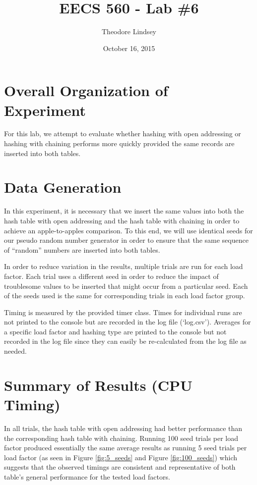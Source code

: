 \documentclass{article}
\title{EECS 560 - Lab \#6}
\author{Theodore Lindsey}
\date{October 16, 2015}
\begin{document}
\maketitle


\section{Overall Organization of Experiment}

For this lab, we attempt to evaluate whether hashing with open addressing or hashing with chaining performs more quickly provided the same records are inserted into both tables.




\section{Data Generation}

In this experiment, it is necessary that we insert the same values into both the hash table with open addressing and the hash table with chaining in order to achieve an apple-to-apples comparison.  To this end, we will use identical seeds for our pseudo random number generator in order to ensure that the same sequence of ``random'' numbers are inserted into both tables.

In order to reduce variation in the results, multiple trials are run for each load factor.  Each trial uses a different seed in order to reduce the impact of troublesome values to be inserted that might occur from a particular seed.  Each of the seeds used is the same for corresponding trials in each load factor group.

Timing is measured by the provided timer class.  Times for individual runs are not printed to the console but are recorded in the log file (`log.csv').  Averages for a specific load factor and hashing type are printed to the console but not recorded in the log file since they can easily be re-calculated from the log file as needed.




\section{Summary of Results (CPU Timing)}

In all trials, the hash table with open addressing had better performance than the corresponding hash table with chaining.  Running 100 seed trials per load factor produced essentially the same average results as running 5 seed trials per load factor (as seen in Figure \ref{fig:5_seeds} and Figure \ref{fig:100_seeds}) which suggests that the observed timings are consistent and representative of both table's general performance for the tested load factors.
\end{document}
